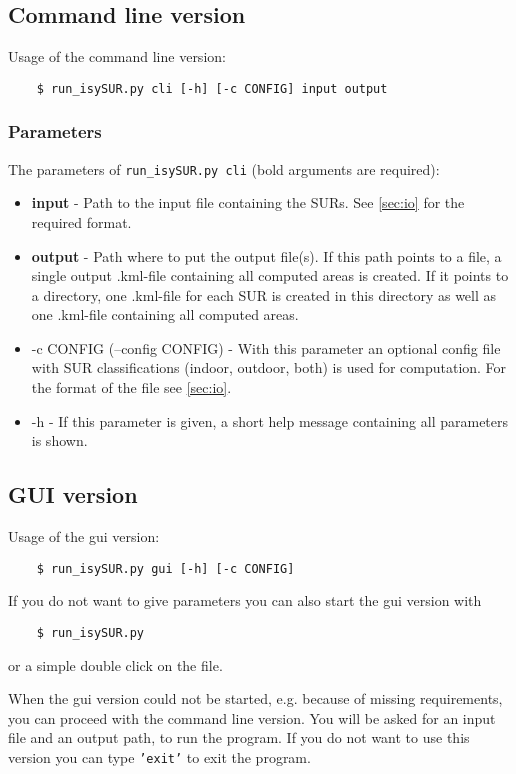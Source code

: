 \documentclass[11pt,fleqn]{book} %
\begin{document}
\subsection{Command line version}\label{sec:cli}
Usage of the command line version:
\begin{verbatim}
	$ run_isySUR.py cli [-h] [-c CONFIG] input output
\end{verbatim}

\subsubsection{Parameters}
The parameters of \texttt{run\_isySUR.py cli} (bold arguments are required):
\begin{itemize}
	\item \textbf{input} - Path to the input file containing the SURs. See \ref{sec:io} for the required format.
	\item \textbf{output} - Path where to put the output file(s). If this path points to a file, a single output .kml-file containing all computed areas is created. If it points to a directory, one .kml-file for each SUR is created in this directory as well as one .kml-file containing all computed areas.
	\item -c CONFIG (--config CONFIG) - With this parameter an optional config file with SUR classifications (indoor, outdoor, both) is used for computation. For the format of the file see \ref{sec:io}.
	\item -h - If this parameter is given, a short help message containing all parameters is shown.
\end{itemize}

\subsection{GUI version}\label{sec:gui}
Usage of the gui version:
\begin{verbatim}
	$ run_isySUR.py gui [-h] [-c CONFIG]
\end{verbatim}
If you do not want to give parameters you can also start the gui version with
\begin{verbatim}
	$ run_isySUR.py
\end{verbatim}
or a simple double click on the file. %

When the gui version could not be started, e.g. because of missing requirements, you can proceed with the command line version. You will be asked for an input file and an output path, to run the program. If you do not want to use this version you can type \texttt{'exit'} to exit the program.
\end{document}
